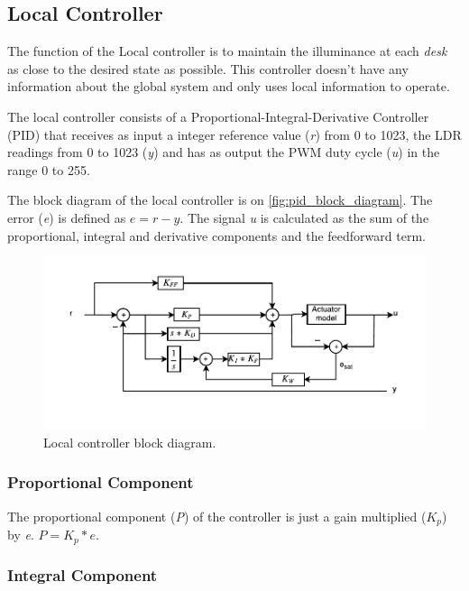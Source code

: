 \subsection{Local Controller}
\label{sec:LocalController}

The function of the Local controller is to maintain the illuminance at each \emph{desk} as close to the desired state as possible. This controller doesn't have any information about the global system and only uses local information to operate.

The local controller consists of a Proportional-Integral-Derivative Controller (PID) that receives as input a integer reference value (\emph{r}) from 0 to 1023, the LDR readings from 0 to 1023 (\emph{y}) and has as output the PWM duty cycle (\emph{u}) in the range 0 to 255.

The block diagram of the local controller is on \autoref{fig:pid_block_diagram}. The error (\emph{e}) is defined as $e = r - y$. The signal \emph{u} is calculated as the sum of the proportional, integral and derivative components and the feedforward term.

\begin{figure}[!ht]
    \centering
        \includegraphics[width=\textwidth]{img/pid_block_diagram}
    \caption{Local controller block diagram.}\label{fig:pid_block_diagram}
\end{figure}


\subsubsection{Proportional Component}
\label{sub:ProportionalComponent}

The proportional component (\emph{P}) of the controller is just a gain multiplied (\emph{$K_p$}) by \emph{e}. $ P = K_p * e$.

\subsubsection{Integral Component}
\label{sub:IntegralComponent}

